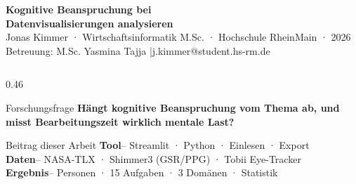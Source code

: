 \documentclass[final]{beamer}
\newcommand{\lw}{0.46\textwidth}
\begin{document}
\begin{frame}[t]{}


\vspace{1.0cm}
{\color{white}\fontsize{52}{62}\selectfont\bfseries
  Kognitive Beanspruchung bei\\[0.3cm]
  Datenvisualisierungen analysieren}\\[0.6cm]
{\color{white}\fontsize{24}{30}\selectfont
  Jonas Kimmer · Wirtschaftsinformatik M.Sc. · Hochschule RheinMain · 2026}\\[0.3cm]
{\color{soft}\fontsize{20}{26}\selectfont
  Betreuung: M.Sc. Yasmina Tajja \quad|\quad j.kimmer@student.hs-rm.de}
\vspace{2.0cm}

\begin{columns}[T]

\begin{column}{\lw}

  \begin{alertblock}{Forschungsfrage}
    \vspace{0.3em}
    \LARGE\bfseries
    Hängt kognitive Beanspruchung vom Thema ab,
    und misst Bearbeitungszeit wirklich mentale Last?
    \vspace{0.3em}
  \end{alertblock}

  \vspace{0.8em}

  \begin{block}{Beitrag dieser Arbeit}
    \vspace{0.4em}
    {\large
    \textcolor{primary}{\bfseries Tool\enskip}--\enskip
      Streamlit · Python · Einlesen · Export\\[0.5em]
    \textcolor{primary}{\bfseries Daten\enskip}--\enskip
      NASA-TLX · Shimmer3 (GSR/PPG) · Tobii Eye-Tracker\\[0.5em]
    \textcolor{primary}{\bfseries Ergebnis\enskip}-- Personen · 15 Aufgaben · 3 Domänen · Statistik
    }
    \vspace{0.3em}
  \end{block}


\end{column}
\end{columns}
\end{frame}
\end{document}
